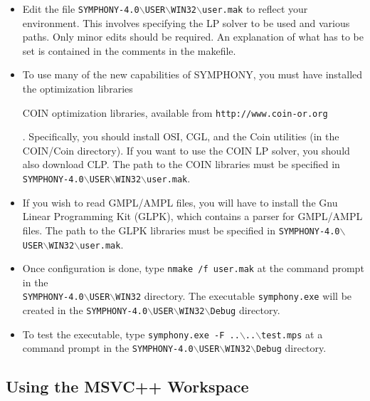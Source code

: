 \begin{itemize}

\item Edit the file
\texttt{SYMPHONY-4.0$\backslash$USER$\backslash$WIN32$\backslash$user.mak} to
reflect your environment. This involves specifying the LP solver to be used
and various paths. Only minor edits should be required. An explanation of what
has to be set is contained in the comments in the makefile.

\item To use many of the new capabilities of SYMPHONY, you must have installed
the \emph{} optimization
libraries 
\begin{latexonly} 
COIN optimization libraries, available from
\texttt{http://www.coin-or.org} 
\end{latexonly}. Specifically, you should
install OSI, CGL, and the Coin utilities (in the COIN/Coin directory). If you
want to use the COIN LP solver, you should also download CLP. The path to the
COIN libraries must be specified in
\texttt{SYMPHONY-4.0$\backslash$USER$\backslash$WIN32$\backslash$user.mak}.

\item If you wish to read GMPL/AMPL files, you will have to install the Gnu
Linear Programming Kit (GLPK), which contains a parser for GMPL/AMPL
files. The path to the GLPK libraries must be specified in
\texttt{SYMPHONY-4.0$\backslash$USER$\backslash$WIN32$\backslash$user.mak}.

\item Once configuration is done, type \texttt{nmake /f user.mak} at the
command prompt in the \\
\texttt{SYMPHONY-4.0$\backslash$USER$\backslash$WIN32} directory. The
executable \texttt{symphony.exe} will be created in the
\texttt{SYMPHONY-4.0$\backslash$USER$\backslash$WIN32$\backslash$Debug}  
directory.

\item To test the executable, type \texttt{symphony.exe -F ..$\backslash$..$\backslash$test.mps} at a command 
prompt in the
\texttt{SYMPHONY-4.0$\backslash$USER$\backslash$WIN32$\backslash$Debug} 
directory.

\end{itemize}

\subsection{Using the MSVC++ Workspace}


